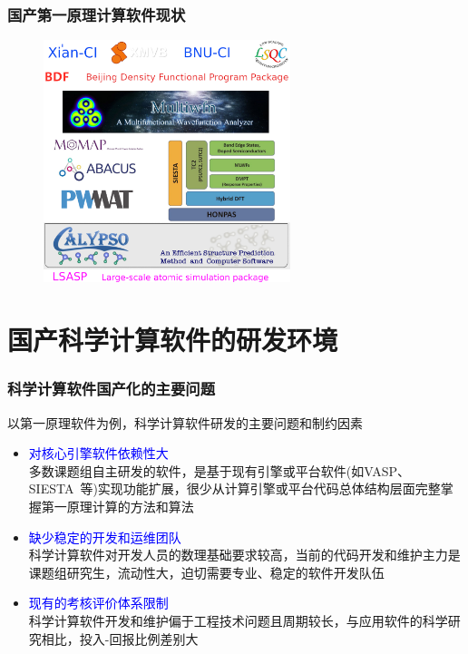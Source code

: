 \documentclass[cjk,slidestop,compress,mathserif,blue]{beamer}
\begin{document}
\frame
{
	\frametitle{国产第一原理计算软件现状}
\begin{figure}[h!]
\vspace*{-0.19in}
\centering
\includegraphics[width=2.83in]{Figures/Softwares_China-logo.png}
\label{Software-China}
\end{figure}
	\fontsize{6.2pt}{5.2pt}\selectfont{\textcolor{red}{中国学科发展战略\,$\cdot$\,理论与计算化学,~~国家自然科学基金委员会,~中国科学院,~~北京:~科学出版社,~~2016}}
}

\section{国产科学计算软件的研发环境}
\frame
{
	\frametitle{科学计算软件国产化的主要问题}
	以第一原理软件为例，科学计算软件研发的主要问题和制约因素
	\begin{itemize}
		\item \textcolor{blue}{对核心引擎软件依赖性大}\\
			多数课题组自主研发的软件，是基于现有引擎或平台软件(如\textrm{VASP}、\textrm{SIESTA}~等)实现功能扩展，很少从计算引擎或平台代码总体结构层面完整掌握第一原理计算的方法和算法
		\item \textcolor{blue}{缺少稳定的开发和运维团队}\\
			科学计算软件对开发人员的数理基础要求较高，当前的代码开发和维护主力是课题组研究生，流动性大，迫切需要专业、稳定的软件开发队伍
		\item \textcolor{blue}{现有的考核评价体系限制}\\
			科学计算软件开发和维护偏于工程技术问题且周期较长，与应用软件的科学研究相比，投入-回报比例差别大
	\end{itemize}
}
\end{document}
